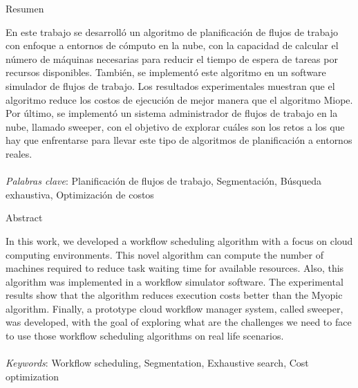 \begin{center}
Resumen
\end{center}
\noindent En este trabajo se desarroll\'o un algoritmo de planificaci\'on de flujos de trabajo con enfoque a entornos de c\'omputo en la nube, con la capacidad de calcular el número de máquinas necesarias para reducir el tiempo de espera de tareas por recursos disponibles. Tambi\'en, se implement\'o este algoritmo en un software simulador de flujos de trabajo. Los resultados experimentales muestran que el algoritmo reduce los costos de ejecuci\'on de mejor manera que el algoritmo Miope. Por \'ultimo, se implement\'o un sistema administrador de flujos de trabajo en la nube, llamado sweeper, con el objetivo de explorar cu\'ales son los retos a los que hay que enfrentarse para llevar este tipo de algoritmos de planificaci\'on a entornos reales.
\\\\
\noindent \emph{Palabras clave}: Planificación de flujos de trabajo, Segmentación, Búsqueda exhaustiva, Optimizaci\'on de costos

\begin{center}
Abstract
\end{center}
\noindent In this work, we developed a workflow scheduling algorithm with a focus on cloud computing environments. This novel algorithm can compute the number of machines required to reduce task waiting time for available resources. Also, this algorithm was implemented in a workflow simulator software. The experimental results show that the algorithm reduces execution costs better than the Myopic algorithm. Finally, a prototype cloud workflow manager system, called sweeper, was developed, with the goal of exploring what are the challenges we need to face to use those workflow scheduling algorithms on real life scenarios.
\\\\
\noindent \emph{Keywords}: Workflow scheduling, Segmentation, Exhaustive search, Cost optimization

\clearpage